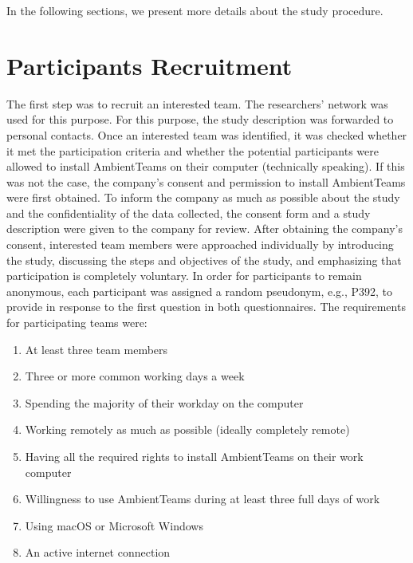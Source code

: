In the following sections, we present more details about the study procedure.

\section{Participants Recruitment}
\label{section:recruitment}
The first step was to recruit an interested team. The researchers' network was used for this purpose. For this purpose, the study description was forwarded to personal contacts. Once an interested team was identified, it was checked whether it met the participation criteria and whether the potential participants were allowed to install AmbientTeams on their computer (technically speaking). If this was not the case, the company's consent and permission to install AmbientTeams were first obtained. To inform the company as much as possible about the study and the confidentiality of the data collected, the consent form and a study description were given to the company for review. After obtaining the company's consent, interested team members were approached individually by introducing the study, discussing the steps and objectives of the study, and emphasizing that participation is completely voluntary. In order for participants to remain anonymous, each participant was assigned a random pseudonym, e.g., P392, to provide in response to the first question in both questionnaires. The requirements for participating teams were:

\begin{enumerate}
    \item At least three team members
    \item Three or more common working days a week
    \item Spending the majority of their workday on the computer
    \item Working remotely as much as possible (ideally completely remote)
    \item Having all the required rights to install AmbientTeams on their work computer
    \item Willingness to use AmbientTeams during at least three full days of work
    \item Using macOS or Microsoft Windows
    \item An active internet connection
\end{enumerate}

